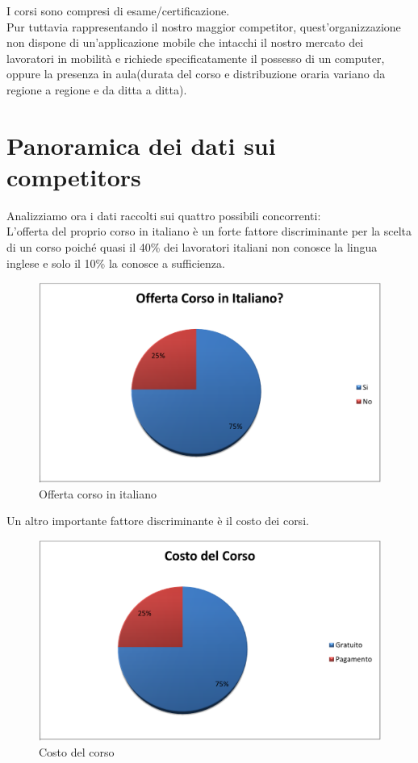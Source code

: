 I corsi sono compresi di esame/certificazione.\\

Pur tuttavia rappresentando il nostro maggior competitor, quest'organizzazione non dispone di un'applicazione mobile che intacchi il nostro mercato dei lavoratori in mobilità e richiede specificatamente il possesso di un computer, oppure la presenza in aula(durata del corso e distribuzione oraria variano da regione a regione e da ditta a ditta).

\section{Panoramica dei dati sui competitors}

Analizziamo ora i dati raccolti sui quattro possibili concorrenti:\\

L'offerta del proprio corso in italiano è un forte fattore discriminante per la scelta di un corso poiché quasi il 40\% dei lavoratori italiani non conosce la lingua inglese e solo il 10\% la conosce a sufficienza.

\begin{figure}[H]
\centering
\includegraphics[scale=0.20]{images/cap4/concorrenza/corsoItaliano.png}
\caption{Offerta corso in italiano}
\end{figure}

Un altro importante fattore discriminante è il costo dei corsi.

\begin{figure}[H]
\centering
\includegraphics[scale=0.20]{images/cap4/concorrenza/costoCorso.png}
\caption{Costo del corso}
\end{figure}

